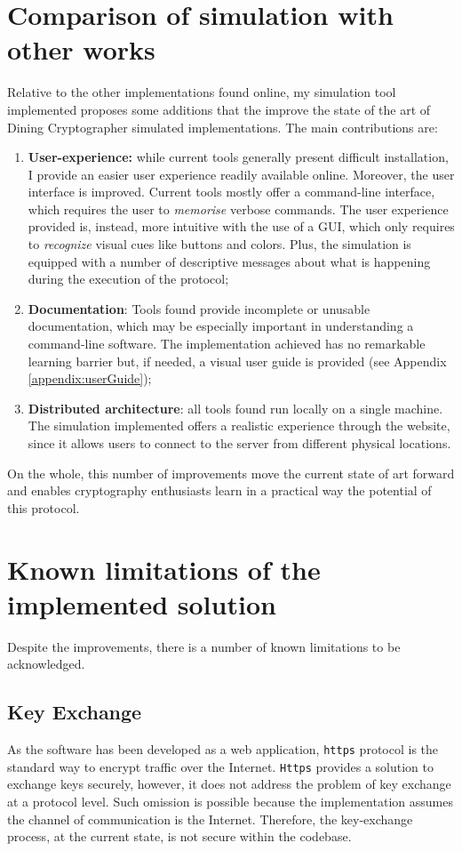 \section{Comparison of simulation with other works}
Relative to the other implementations found online, my simulation tool implemented proposes some additions that the improve the state of the art of Dining Cryptographer simulated implementations. The main contributions are:
\begin{enumerate}
    \item \textbf{User-experience:} while current tools generally present difficult installation, I provide an easier user experience readily available online. Moreover, the user interface is improved. Current tools mostly offer a command-line interface, which requires the user to \textit{memorise} verbose commands. The user experience provided is, instead, more intuitive with the use of a GUI, which only requires to \textit{recognize} visual cues like buttons and colors. Plus, the simulation is equipped with a number of descriptive messages about what is happening during the execution of the protocol;
    \item \textbf{Documentation}: Tools found provide incomplete or unusable documentation, which may be especially important in understanding a command-line software. The implementation achieved has no remarkable learning barrier but, if needed, a visual user guide is provided (see Appendix \ref{appendix:userGuide});
    \item \textbf{Distributed architecture}: all tools found run locally on a single machine. The simulation implemented offers a realistic experience through the website, since it allows users to connect to the server from different physical locations.
\end{enumerate}

On the whole, this number of improvements move the current state of art forward and enables cryptography enthusiasts learn in a practical way the potential of this protocol.

\section{Known limitations of the implemented solution}
\noindent Despite the improvements, there is a number of known limitations to be acknowledged. 

\subsection{Key Exchange}
As the software has been developed as a web application, \lstinline{https} protocol is the standard way to encrypt traffic over the Internet. \lstinline{Https} provides a solution to exchange keys securely, however, it does not address the problem of key exchange at a protocol level. Such omission is possible because the implementation assumes the channel of communication is the Internet. Therefore, the key-exchange process, at the current state, is not secure within the codebase.

